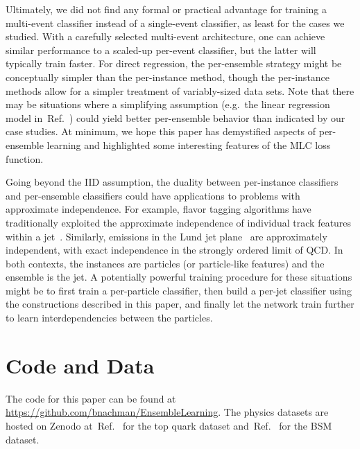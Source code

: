 \documentclass[aps,prx,reprint,preprintnumbers,superscriptaddress,nofootinbib,longbibliography,floatfix]{revtex4-2}
\DeclareRobustCommand{\Ref}[1]{Ref.~\cite{#1}}
\begin{document}
Ultimately, we did not find any formal or practical advantage for training a multi-event classifier instead of a single-event classifier, as least for the cases we studied.
%
With a carefully selected multi-event architecture, one can achieve similar performance to a scaled-up per-event classifier, but the latter will typically train faster.
%
For direct regression, the per-ensemble strategy might be conceptually simpler than the per-instance method, though the per-instance methods allow for a simpler treatment of variably-sized data sets.
%
Note that there may be situations where a simplifying assumption (e.g.~the linear regression model in~\Ref{Flesher:2020kuy}) could yield better per-ensemble behavior than indicated by our case studies.
%
At minimum, we hope this paper has demystified aspects of per-ensemble learning and highlighted some interesting features of the MLC loss function.


Going beyond the IID assumption, the duality between per-instance classifiers and per-ensemble classifiers could have applications to problems with approximate independence.
%
For example, flavor tagging algorithms have traditionally exploited the approximate independence of individual track features within a jet~\cite{Aaboud:2018xwy,Chatrchyan:2012jua}.
%
Similarly, emissions in the Lund jet plane~\cite{Andersson:1988gp,Dreyer:2018nbf} are approximately independent, with exact independence in the strongly ordered limit of QCD.
%
In both contexts, the instances are particles (or particle-like features) and the ensemble is the jet.
%
A potentially powerful training procedure for these situations might be to first train a per-particle classifier, then build a per-jet classifier using the constructions described in this paper, and finally let the network train further to learn interdependencies between the particles.


\section*{Code and Data}

The code for this paper can be found at \url{https://github.com/bnachman/EnsembleLearning}. The physics datasets are hosted on Zenodo at~\Ref{anders_andreassen_2020_4067673} for the top quark dataset and~\Ref{kasieczka_gregor_2019_4287846} for the BSM dataset. 
\end{document}
